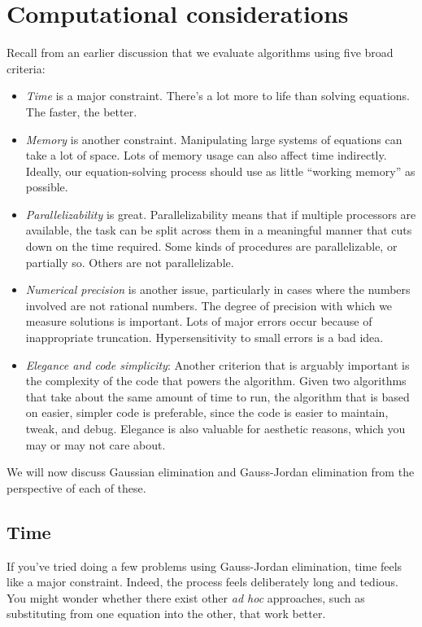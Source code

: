 \documentclass[10pt]{amsart}
\begin{document}
\section{Computational considerations}

Recall from an earlier discussion that we evaluate algorithms using
five broad criteria:

\begin{itemize}
\item {\em Time} is a major constraint. There's a lot more to life
  than solving equations. The faster, the better.
\item {\em Memory} is another constraint. Manipulating large systems
  of equations can take a lot of space. Lots of memory usage can also
  affect time indirectly. Ideally, our equation-solving process should
  use as little ``working memory'' as possible.
\item {\em Parallelizability} is great. Parallelizability means that
  if multiple processors are available, the task can be split across
  them in a meaningful manner that cuts down on the time
  required. Some kinds of procedures are parallelizable, or partially
  so. Others are not parallelizable.
\item {\em Numerical precision} is another issue, particularly in
  cases where the numbers involved are not rational numbers. The
  degree of precision with which we measure solutions is
  important. Lots of major errors occur because of inappropriate
  truncation. Hypersensitivity to small errors is a bad idea.
\item {\em Elegance and code simplicity}: Another criterion that is
  arguably important is the complexity of the code that powers the
  algorithm. Given two algorithms that take about the same amount of
  time to run, the algorithm that is based on easier, simpler code is
  preferable, since the code is easier to maintain, tweak, and
  debug. Elegance is also valuable for aesthetic reasons, which you
  may or may not care about.
\end{itemize}

We will now discuss Gaussian elimination and Gauss-Jordan elimination
from the perspective of each of these.

\subsection{Time}

If you've tried doing a few problems using Gauss-Jordan elimination,
time feels like a major constraint. Indeed, the process feels
deliberately long and tedious. You might wonder whether there exist
other {\em ad hoc} approaches, such as substituting from one equation
into the other, that work better.
\end{document}
